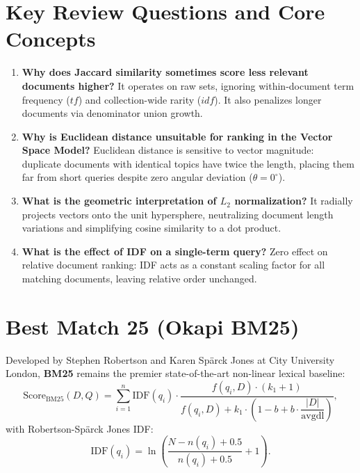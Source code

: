 \FloatBarrier
\section{Key Review Questions and Core Concepts}
\label{sec:review-questions-en}

\begin{enumerate}
    \item \textbf{Why does Jaccard similarity sometimes score less relevant documents higher?}
    It operates on raw sets, ignoring within-document term frequency ($tf$) and collection-wide rarity ($idf$). It also penalizes longer documents via denominator union growth.
    \item \textbf{Why is Euclidean distance unsuitable for ranking in the Vector Space Model?}
    Euclidean distance is sensitive to vector magnitude: duplicate documents with identical topics have twice the length, placing them far from short queries despite zero angular deviation ($\theta = 0^\circ$).
    \item \textbf{What is the geometric interpretation of $L_2$ normalization?}
    It radially projects vectors onto the unit hypersphere, neutralizing document length variations and simplifying cosine similarity to a dot product.
    \item \textbf{What is the effect of IDF on a single-term query?}
    Zero effect on relative document ranking: IDF acts as a constant scaling factor for all matching documents, leaving relative order unchanged.
\end{enumerate}

\FloatBarrier
\section{Best Match 25 (Okapi BM25)}
\label{sec:bm25-deep-en}

Developed by Stephen Robertson and Karen Sp\"arck Jones at City University London, \textbf{BM25} remains the premier state-of-the-art non-linear lexical baseline:
\begin{equation}
\text{Score}_{\text{BM25}}(D, Q) = \sum_{i=1}^{n} \text{IDF}(q_i) \cdot \frac{f(q_i, D) \cdot (k_1 + 1)}{f(q_i, D) + k_1 \cdot \left(1 - b + b \cdot \dfrac{|D|}{\text{avgdl}}\right)},
\end{equation}
with Robertson-Sp\"arck Jones IDF:
\begin{equation}
\text{IDF}(q_i) = \ln\left( \frac{N - n(q_i) + 0.5}{n(q_i) + 0.5} + 1 \right).
\end{equation}

